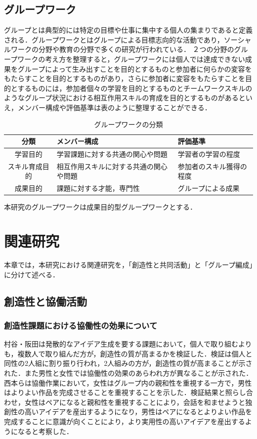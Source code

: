 \documentclass{funthesis}
\begin{document}
\section{グループワーク}
グループとは典型的には特定の目標や仕事に集中する個人の集まりであると定義される．グループワークとはグループによる目標志向的な活動であり，ソーシャルワークの分野や教育の分野で多くの研究が行われている\cite{A13}．
２つの分野のグループワークの考え方を整理すると，グループワークには個人では達成できない成果をグループによって生み出すことを目的とするものと参加者に何らかの変容をもたらすことを目的とするものがあり，さらに参加者に変容をもたらすことを目的とするものには，参加者個々の学習を目的とするものとチームワークスキルのようなグループ状況における相互作用スキルの育成を目的とするものがあるといえ，メンバー構成や評価基準は表のように整理することができる\cite{A13}．
\begin{table}[h]
\begin{center}
  \caption{グループワークの分類}
  \begin{tabular}{|c|p{60mm}|p{43mm}|}\hline
    分類& メンバー構成&評価基準\tabularnewline \hline
    学習目的& 学習課題に対する共通の関心や問題 & 
    学習者の学習の程度\tabularnewline
    スキル育成目的&相互作用スキルに対する共通の関心や問題& 
    参加者のスキル獲得の程度\tabularnewline
    成果目的&課題に対する才能，専門性&
    グループによる成果\tabularnewline
    \hline
  \end{tabular}
  \label{groupwork}
  \end{center}
\end{table}

本研究のグループワークは成果目的型グループワークとする．



\chapter{関連研究}
本章では，本研究における関連研究を，「創造性と共同活動」と「グループ編成」に分けて述べる．
\section{創造性と協働活動}

\subsection{創造性課題における協働性の効果について} %
村谷・阪田\cite{A10}は発散的なアイデア生成を要する課題において，個人で取り組むよりも，複数人で取り組んだ方が，創造性の質が高まるかを検証した．検証は個人と同性の2人組に割り振り行われ，2人組みの方が，創造性の質が高まることが示された．また男性と女性では協働性の効果のあらわれ方が異なることが示された．西本ら\cite{A11}は協働作業において，女性はグループ内の親和性を重視する一方で，男性はよりよい作品を完成させることを重視することを示した．検証結果と照らし合わせ，女性はペアになると親和性を重視することにより，会話を和ませようと独創性の高いアイデアを産出するようになり，男性はペアになるとよりよい作品を完成することに意識が向くことにより，より実用性の高いアイデアを産出するようになると考察した．
\end{document}
